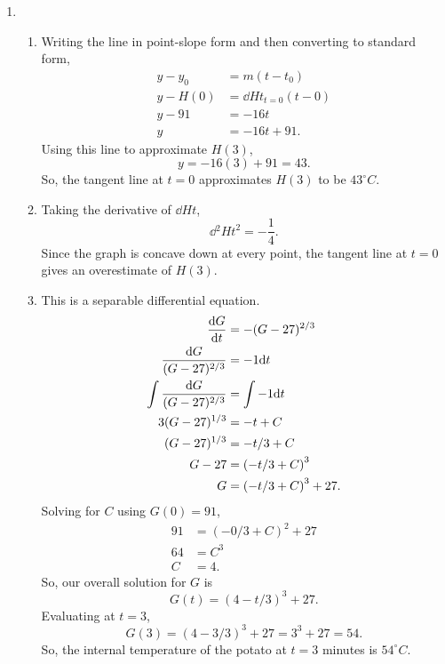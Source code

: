\begin{enumerate}
	\item \begin{enumerate}
		\item Writing the line in point-slope form and then converting to standard form,
			\begin{align*}
				y - y_0 &= m(t-t_0) \\
				y - H(0) &= \dd{H}{t}_{t=0}(t-0) \\
				y - 91 &= -16t \\
				y &= -16t + 91.
			\end{align*}
			Using this line to approximate $H(3)$,
			\begin{equation*}
				y = -16(3) + 91 = 43.
			\end{equation*}
			So, the tangent line at $t=0$ approximates $H(3)$ to be $43^\circ C$.
		\item Taking the derivative of $\dd{H}{t}$,
			\begin{equation*}
				\dd{^2H}{t^2} = -\frac{1}{4}.
			\end{equation*}
			Since the graph is concave down at every point, the tangent line at $t=0$ gives an overestimate of $H(3)$.
		\item This is a separable differential equation.
			\begin{align*}
				\frac{\mathrm{d} G}{\mathrm{d} t} &= -(G-27)^{2/3} \\
				\frac{\mathrm{d} G}{(G-27)^{2/3}} &= -1\mathrm{d} t \\
				\int{\frac{\mathrm{d} G}{(G-27)^{2/3}}} &= \int{-1\mathrm{d} t} \\
				3(G-27)^{1/3} &= -t + C \\
				(G-27)^{1/3} &= -t/3 + C \\
				G - 27 &= \left(-t/3 + C\right)^3 \\
				G &= \left(-t/3 + C\right)^3 + 27.
			\end{align*}
			Solving for $C$ using $G(0)=91$,
			\begin{align*}
				91 &= \left(-0/3 + C\right)^2 + 27 \\
				64 &= C^3 \\
				C &= 4.
			\end{align*}
			So, our overall solution for $G$ is
			\begin{equation*}
				G(t) = \left(4 - t/3\right)^3 + 27.
			\end{equation*}
			Evaluating at $t=3$,
			\begin{equation*}
				G(3) = \left(4 - 3/3\right)^3 + 27 = 3^3  + 27 = 54.
			\end{equation*}
			So, the internal temperature of the potato at $t=3$ minutes is $54^\circ C$.
	\end{enumerate}


\end{enumerate}
